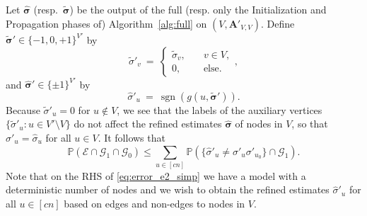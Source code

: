 \documentclass[letterpaper,11pt]{article}
\theoremstyle{definition}
\def\P{\mathbb{P}}
\def\bA{\bm{A}}
\newcommand{\hsigma}{\hat{\sigma}}
\newcommand{\tsigma}{\tilde{\sigma}}
\newcommand{\bsigma}{\bm{\sigma}}
\newcommand{\hbsigma}{\hat{\bsigma}}
\newcommand{\tbsigma}{\tilde{\bsigma}}
\def\cE{\mathcal{E}}
\def\cG{\mathcal{G}}
\def\weq{ \ = \ }
\newcommand{\sign}{\operatorname{sgn}}
\numberwithin{equation}{section}
\theoremstyle{definition}
\def\P{\mathbb{P}}
\def\bA{\bm{A}}
\newcommand{\hsigma}{\hat{\sigma}}
\newcommand{\tsigma}{\tilde{\sigma}}
\newcommand{\bsigma}{\bm{\sigma}}
\newcommand{\hbsigma}{\hat{\bsigma}}
\newcommand{\tbsigma}{\tilde{\bsigma}}
\def\cE{\mathcal{E}}
\def\cG{\mathcal{G}}
\def\weq{ \ = \ }
\newcommand{\sign}{\operatorname{sgn}}
\numberwithin{equation}{section}
\theoremstyle{thmstyletwo}%
\begin{document}
Let $\hbsigma$ (resp.\ $\tbsigma$) be the output of the full (resp. only the Initialization and Propagation phases of) Algorithm~\ref{alg:full} on $(V,\bA'_{V,V})$. Define
$\tbsigma' \in \{-1, 0, +1\}^{V'}$ by
\[
\tsigma'_v
\weq 
\begin{cases}
\tsigma_v, &\quad v \in V, \\
0, &\quad \text{else}.
\end{cases},
\]
and $\hbsigma' \in \{\pm 1\}^{V'}$ by
\[
\hsigma'_u
\weq \sign( g(u, \tbsigma') ).
\]
Because $\tsigma'_u = 0$ for $u \notin V$, we see that the labels of the
auxiliary vertices $\{\tsigma'_u: u\in V'\setminus V\}$ do not affect the refined estimates $\hbsigma$ of nodes in $V$, so that
$\hsigma'_u = \hsigma_u$ for all $u \in V$.
It follows that
\begin{equation}
\P(\cE \cap \cG_1 \cap \cG_0 )
\le \sum_{u \in [cn]} \P( \{\hsigma'_u \ne \sigma'_u \sigma'_{u_0}\} \cap \cG_1 ).
\label{eq:error_e2_simp}
\end{equation}
Note that on the RHS of \eqref{eq:error_e2_simp} we have a model with a deterministic number of nodes and we wish to obtain the refined estimates $\hsigma'_u$ for all $u\in [cn]$ based on edges and non-edges to nodes in $V$. 
\end{document}
